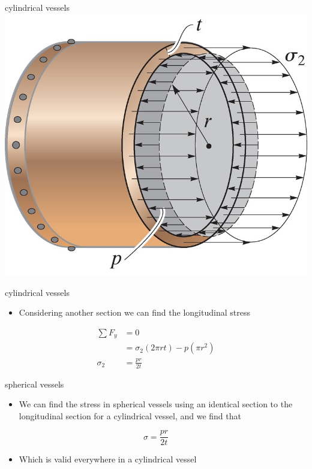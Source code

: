\documentclass[
  letterpaper,
  ignorenonframetext,
  aspectratio=43,
  handout,
  12pt]{beamer}
\providecommand{\tightlist}{%
  \setlength{\itemsep}{0pt}\setlength{\parskip}{0pt}}
\providecommand{\tightlist}{%
\setlength{\itemsep}{0pt}\setlength{\parskip}{0pt}}
\let\Oldincludegraphics\includegraphics
\renewcommand{\includegraphics}[2][]{\Oldincludegraphics[width=\textwidth,height=0.7\textheight,keepaspectratio]{#2}}
\begin{document}
\begin{frame}{cylindrical vessels}
\protect\hypertarget{cylindrical-vessels-2}{}
\includegraphics{../images/cylinder-end.jpg}
\end{frame}

\begin{frame}{cylindrical vessels}
\protect\hypertarget{cylindrical-vessels-3}{}
\begin{itemize}
\tightlist
\item
  Considering another section we can find the longitudinal stress
\end{itemize}

\[\begin{aligned}
  \sum F_y &= 0\\
  &= \sigma_2 (2\pi rt) - p (\pi r^2)\\
  \sigma_2 &= \frac{pr}{2t}
\end{aligned}\]
\end{frame}

\begin{frame}{spherical vessels}
\protect\hypertarget{spherical-vessels}{}
\begin{itemize}
\tightlist
\item
  We can find the stress in spherical vessels using an identical section
  to the longitudinal section for a cylindrical vessel, and we find that
\end{itemize}

\[\sigma = \frac{pr}{2t}\]

\begin{itemize}
\tightlist
\item
  Which is valid everywhere in a cylindrical vessel
\end{itemize}
\end{frame}
\end{document}
